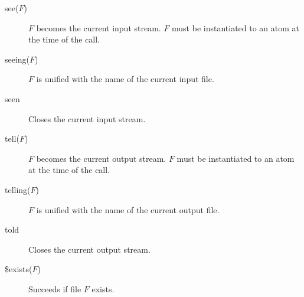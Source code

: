 \begin{description}
\item[see($F$)] 
$F$ becomes the current input stream.
$F$ must be instantiated to an atom at the time of the call.

\item[seeing($F$)] 
$F$ is unified with the name of the current input file.

\item[seen] 
Closes the current input stream.

\item[tell($F$)] 
$F$ becomes the current output stream.
$F$ must be instantiated to an atom at the time of the call.

\item[telling($F$)] 
$F$ is unified with the name of the current output file.

\item[told] 
Closes the current output stream.

\item[\$exists($F$)] 
Succeeds if file $F$ exists.
\end{description}

